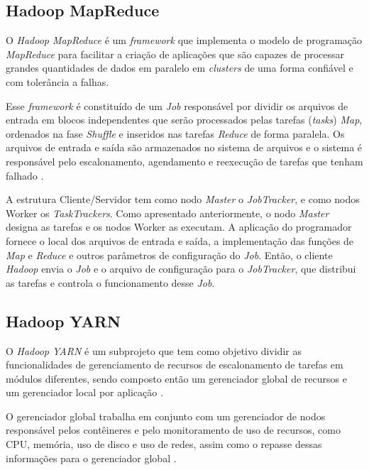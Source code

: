 \subsection{Hadoop MapReduce} \label{ssec:hadoopmapreduce}

O \textit{Hadoop MapReduce} é um \textit{\gls{framework}} que implementa o modelo de programação \textit{MapReduce} para facilitar a criação de aplicações que são capazes de processar grandes quantidades de dados em paralelo em \textit{clusters} de uma forma confiável e com tolerância a falhas. 

Esse \textit{\gls{framework}} é constituído de um \textit{Job} responsável por dividir os arquivos de entrada em blocos independentes que serão processados pelas tarefas (\textit{tasks}) \textit{Map}, ordenados na fase \textit{Shuffle} e inseridos nas tarefas \textit{Reduce} de forma paralela. Os arquivos de entrada e saída são armazenados no sistema de arquivos e o sistema é responsável pelo escalonamento, agendamento e reexecução de tarefas que tenham falhado \cite{HadoopMapReduce22}.

A estrutura Cliente/Servidor tem como nodo \textit{Master} o \textit{JobTracker}, e como nodos Worker os \textit{TaskTrackers}. Como apresentado anteriormente, o nodo \textit{Master} designa as tarefas e os nodos Worker as executam. A aplicação do programador fornece o local dos arquivos de entrada e saída, a implementação das funções de \textit{Map} e \textit{Reduce} e outros parâmetros de configuração do \textit{Job}. Então, o cliente \textit{Hadoop} envia o \textit{Job} e o arquivo de configuração para o \textit{JobTracker}, que distribui as tarefas e controla o funcionamento desse \textit{Job}.

\subsection{Hadoop YARN} \label{ssec:hadoopyarn}

O \textit{Hadoop YARN} é um subprojeto que tem como objetivo dividir as funcionalidades de gerenciamento de recursos de escalonamento de tarefas em módulos diferentes, sendo composto então um gerenciador global de recursos e um gerenciador local por aplicação \cite{GoldmanApache12}. 

O gerenciador global trabalha em conjunto com um gerenciador de nodos responsável pelos contêineres e pelo monitoramento de uso de recursos, como CPU, memória, uso de disco e uso de redes, assim como o repasse dessas informações para o gerenciador global \cite{HadoopYarn22}.

